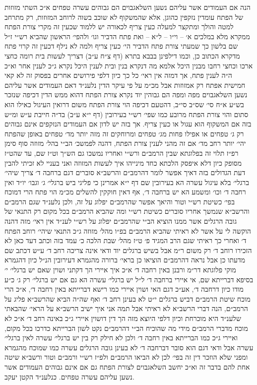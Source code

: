 \documentclass[12pt, openany]{book}
\begin{document}
\begin{multicols}{2}
הנה אם העמודים אשר עליהם נשען השלאגבוים הם גבוהים עשרה טפחים א״כ השתי מזוזות של הפתח עומדין נזקפין כהוגן, אלא שהמשקוף לא שוכב בשוה לרוחב המזוזות, רק מתרחב למטה והולך ומתקצר למעלה כעין צריף לכאורה יש ללמוד שכעין זה מקרי צורת הפתח ממקרא מלא במלכים א׳ – וי״ו – ל״א – ואת פתח הדביר וגו׳ ולהפי׳ הראשון שהביא רש״י ז״ל שם בלשון כך שמעתי צורת פתח הדביר הי׳ כעין צריף ולמה לא נילף דכעין זה קרוי פתח מדקרא הכתוב כן, וכמו דילפינן בבבא בתרא (דף צ״ח ע״ב) דצריך לעשות בית רומה כחצי ארכו וכחצי רחבו מבנין היכל אלמא מה דנקרא בנין ובית לענין היכל נקרא ג״כ לענין אחר וא״כ ה״ה לענין פתח, אך דמזה אין ראי׳ כל כך כיון דלפי פירושים אחרים בפסוק זה לא קאי חמישית אפתח רק אמזוזות אבל מכ״מ על פי עיקר הדין נלענ״ד דאם העמודים אשר עליהם נשען השלאגבוים מפה ומפה הם גבוהין יוד נקרא צורת הפתח דהוא ממש הדין דכיפה שנזכר בש״ע א״ח סי׳ שס״ב סי״ב, דהטעם דכיפה הוי צורת הפתח משום דרואין העיגול כאילו הוא סתום והוי צורת הפתח מרובע כמו שפי׳ רש״י בעירובין (דף י״א ע״ב) בד״ה חייבת ע״ש ומ״ש בזה אם המשקוף הוא עגול או כעין צריף. אך בזה יש לדון אם העמודים הנזקפים אינם גבוהים רק ג׳ טפחים או אפילו פחות מג׳ טפחים ומרוחקים זה מזה יותר מד׳ טפחים באופן שהפתח יהי׳ יותר רחב מד׳ אם זה מהני לענין צורת הפתח, דהנה לפמשכ׳ הב״י בהל׳ מזוזה סוף סימן רפ״ז תלוי זה בפלוגתא שבין הרמב״ם ורש״י ואחריו נמשכו גם הש״ך וט״ז שם, עד שהט״ז מסופק כיון דלא איפסק הלכתא כחד מינייהו איך לעשות המזוזה ואני בעניי לא זכיתי להבין דעת הגדולים בזה דאיך אפשר לומר דהרמב״ם והרשב״א סוברים דגם ברחבה ד׳ צריך שיהי׳ ברגלי׳ בלא עיגול עשרה הא בעירובין שם דף י״א אמרינן כי פליגי ביש ברגלי׳ ג׳ וגבו׳ יו״ד ואין רחבה ד׳ וכו׳ ומשמע הא יש ברחבה ד׳, אף דאין חוקקין להשלים מכ״מ הוי פתח הרי דמוכח בפי׳ כשיטת רש״י וטור והיאך אפשר שהרמב״ם יפלוג על זה, ולכן נלענ״ד שגם הרמב״ם והרשב״א שנמשך אחריו סוברים כשיטת רש״י ומה שהביא הרמב״ם בכל מקום רק התנאי של גובה הרגלים אשר ממנו הוציא הב״י שהרמב״ם יפלוג על רש״י לענ״ד אין ראי׳ מזה דהנה הוקשה לי על אשר לא ראיתי שהביא הרמב״ם בפ״ו מהל׳ מזוזה ג״כ התנאי שיהי׳ רוחב הפתח ד׳ ואחרי כך ראיתי שגם הרב המגיד פ׳ ט״ז מהל׳ שבת הלכה כ׳ עמד בזה וכתב דעד כאן לא הזכירו רוחב ד׳ רק משום ר״מ אבל בשיש ברגלים יוד ודאי אינה צריכה רחב ד׳ ע״ש דכתב שם מדעתו כן אבל נראה דהרמב״ם הוציאו כן בראי׳ ברורה מהגמרא דעירובין הנ״ל כיון דהגמרא מוקי פלוגתא דר״מ ורבנן באין רחבה ד׳ א״כ איך איירי הך דקתני ושוין שאם יש ברגלי׳ י׳ בסיפא דברייתא שם, אי איירי ברחבה ד׳ ל״ל יש ברגלי׳ עשרה הא גם אם יש ברגלי׳ רק ג׳ כ״ע מודו כיון דרחבה ד׳, אע״כ דגם האי ושוין איירי כמו רישא דברייתא באין רחבה ד׳, א״כ הרי מוכח שיטת הרמב״ם דביש ברגלים י״ט לא בעינן רחב ד׳ ואף שה״ה הביא שהרשב״א פליג על הרמב״ם, הנה דברי הרשב״א לא ראיתי אבל תמה אני איך ישיב הרשב״א על הראי׳ שהבאתי שלענ״ד היא מוכרחת וכיון דלפי היוצא מזה הך דין דושוין איירי ג״כ באינה רחב ד׳ א״כ לא מוכח מדברי הרמב״ם מידי מה שהוכיח הב״י דהרמב״ם נקט לשון הברייתא כדרכו בכל מקום, ואיירי ג״כ כמו הברייתא באין רחבה ד׳ ולכן לא חילק רק בין יש ברגלי׳ עשרה לאין ברגלי׳ עשרה אבל ודאי דגם הוא סובר דברחבה ד׳ לא בעינן גובה הרגלים עשרה כמו שמוכח מהגמרא ומפני שלא הוזכר דין זה בפי׳ לכן לא הביאו הרמב״ם ולפ״ז רש״י ורמב״ם וטור ורשב״א שיטה אחת להם בדבר זה וא״כ יחשב השלאגבוים לצורת הפתח גם אם אינם גבוהים העמודים אשר נשען עליהם עשרה טפחים. כנלענ״ד הקטן יעקב.\\\vspace{0pt}

\end{multicols}\newpage
\end{document}
